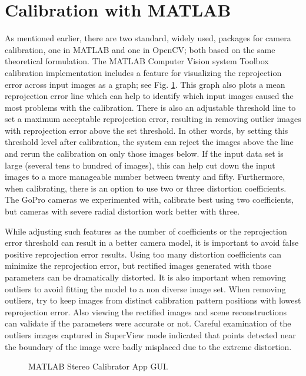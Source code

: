\section{Calibration with MATLAB}\label{sec:calibmatlab}
As mentioned earlier, there are two standard, widely used, packages for camera calibration, one in MATLAB and one in OpenCV; both based on the same theoretical formulation. 
The MATLAB Computer Vision system Toolbox calibration implementation includes a feature for visualizing the reprojection error across input images as a graph; see Fig. \ref{fig:results1}. This graph also plots a mean reprojection error line which can help to identify which input images caused the most problems with the calibration. There is also an adjustable threshold line to set a maximum acceptable reprojection error, resulting in removing outlier images with reprojection error above the set threshold. In other words, by setting this threshold level after calibration, the system can reject the images above the line and rerun the calibration on only those images below. If the input data set is large (several tens to hundred of images), this can help cut down the input images to a more manageable  number between twenty and fifty. Furthermore, when calibrating, there is an option to use two or three distortion coefficients. The GoPro cameras we experimented with, calibrate best using two coefficients, but cameras with severe radial distortion work better with three.

While adjusting such features as the number of coefficients or the reprojection error threshold can result in a better camera model, it is important to avoid false positive reprojection error results. Using too many distortion coefficients can minimize the reprojection error, but rectified images generated with those parameters can be dramatically distorted. It is also important when removing outliers to avoid fitting the model to a non diverse image set. When removing outliers, try to keep images from distinct calibration pattern positions with lowest reprojection error. Also viewing the rectified images and scene reconstructions can validate if the parameters were accurate or not. 
Careful examination of the outliers images captured in SuperView mode indicated that points detected near the boundary of the image were badly misplaced due to the extreme distortion. 

\begin{figure}[bh]
	\centering
	\caption{MATLAB Stereo Calibrator App GUI.}
	\label{fig:results1}
\end{figure}